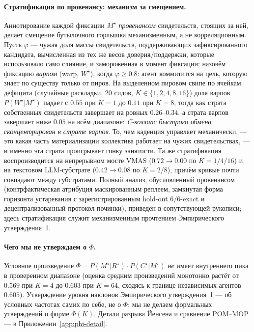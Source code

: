 \documentclass{article}
\begin{document}
\paragraph{Стратификация по провенансу: механизм за смещением.}
Аннотирование каждой фиксации $M^\star$ \emph{провенансом} свидетельств,
стоящих за ней, делает смещение бутылочного горлышка механизменным, а не
корреляционным. Пусть $\varphi$ --- чужая доля массы свидетельств,
поддерживающих зафиксированного кандидата, вычисленная из тех же весов
доверия/поддержки, которые использовало само слияние, и замороженная в момент фиксации; назовём фиксацию
\emph{варпом} (warp, $W^\star$), когда $\varphi \ge 0.8$: агент
коммитится на цель, которую знает по существу только от пиров. На
выделенном пировом свипе по ячейкам дефицита (случайные раскладки, 20
сидов, $K\in\{1,2,4,8,16\}$) доля варпов $P(W^\star|M^\star)$
падает с $0.55$ при $K{=}1$ до $0.11$ при $K{=}8$, тогда как страта
собственных свидетельств завершает на ровных $0.26$--$0.34$, а страта варпов
завершает ниже $0.05$ на всём диапазоне: \emph{C-коллапс
быстрого обмена сконцентрирован в страте варпов}. То, чем каденция
управляет механически, --- это какая часть материализации коллектива
работает на чужих свидетельствах, --- и именно эта страта проигрывает
гонку занятости. Та же стратификация
воспроизводится на непрерывном мосте VMAS ($0.72\to0.00$ по
$K{=}1/4/16$) и на текстовом LLM-субстрате ($0.42\to0.08$ по
$K{=}2/8$), причём кривые почти совпадают между субстратами. Полный
анализ, обусловленный провенансом (контрфактическая атрибуция маскированным
реплеем, замкнутая форма горизонта устаревания с зарегистрированным
hold-out $6/6$-exact и децентрализованный протокол починки), приведён в
сопутствующей рукописи; здесь стратификация служит
механизменным прочтением Эмпирического утверждения~1.

\paragraph{Чего мы не утверждаем о $\Phi$.} Условное произведение $\Phi = P(M^\star|R^\star)\!\cdot\!P(C^\star|M^\star)$ \emph{не} имеет внутреннего пика в проверенном диапазоне (оценка средним произведений монотонно растёт от $0.569$ при $K{=}4$ до $0.603$ при $K{=}64$, сходясь к границе независимых агентов $0.605$). Утверждение уровня наклонов Эмпирического утверждения~1 --- об условных частотах самих по себе, не о $\Phi$; мы не делаем формальных утверждений о форме $\Phi(K)$. Детали разрыва Йенсена и сравнение POM--MOP --- в Приложении~\ref{app:phi-detail}.
\end{document}
